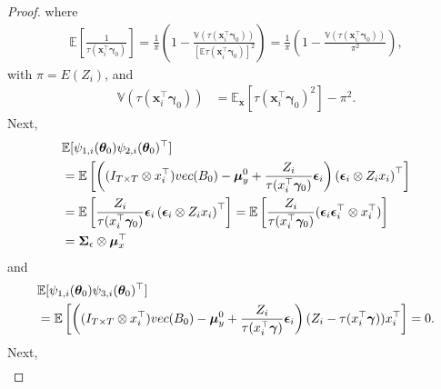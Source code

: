 \documentclass[10pt,a4paper]{amsart}
\newcommand{\IdenMat}{\textbf{I}}
\newcommand{\LogCoe}{\boldsymbol{\gamma}}
\newcommand{\ObsCov}{\textbf{x}_i}
\newcommand{\vect}{\emph{vec}}
\begin{document}
\begin{proof}
        where 
            \begin{align*}
                \mathbb{E}\left[ \frac{1}{\tau(\ObsCov^{\top}\LogCoe_0)} \right] = \frac{1}{\pi}\left( 1 - \frac{\mathbb{V}(\tau(\ObsCov^{\top}\LogCoe_0))}{ [\mathbb{E}\tau(\ObsCov^{\top}\LogCoe_0)]^2 } \right) = \frac{1}{\pi} \left(1 - \frac{\mathbb{V}(\tau(\ObsCov^{\top}\LogCoe_0))}{\pi^2} \right),
            \end{align*}
            with $\pi=E(Z_i)$,
            and
            \begin{align*}
                \mathbb{V}(\tau(\ObsCov^{\top}\LogCoe_0)) &= \mathbb{E}_{\textbf{x}}[ \tau(\ObsCov^{\top}\LogCoe_0)^2 ] - \pi^2.
            \end{align*}
        Next,        
            \begin{align*}
                &
                \mathbb{E} [ \psi_{1,i}(\boldsymbol{\theta}_0) \psi_{2,i}(\boldsymbol{\theta}_0)^{\top} ] \\
                &= \mathbb{E} \left[ \left( (\IdenMat_{T \times T} \otimes \ObsCov^{\top})\vect(\textbf{B}_0) - \boldsymbol{\mu}_y^0 + \frac{Z_i}{\tau(\ObsCov^{\top}\LogCoe_0)}\boldsymbol{\epsilon}_i \right) \left( \boldsymbol{\epsilon}_i \otimes Z_i \ObsCov \right)^{\top} \right] \\
                &= \mathbb{E} \left[ \frac{Z_i}{\tau(\ObsCov^{\top}\LogCoe_0)} \boldsymbol{\epsilon}_i  \left( \boldsymbol{\epsilon}_i \otimes Z_i \ObsCov \right)^{\top} \right] 
                = \mathbb{E} \left[ \frac{Z_i}{\tau(\ObsCov^{\top}\LogCoe_0)}  ( \boldsymbol{\epsilon}_i \boldsymbol{\epsilon}_i^{\top} \otimes \ObsCov^{\top} ) \right] \\
                &= \boldsymbol{\Sigma}_{\epsilon} \otimes\boldsymbol{\mu}_x^{\top}
            \end{align*}
        and 
            \begin{align*}
                &\mathbb{E} [ \psi_{1,i}(\boldsymbol{\theta}_0) \psi_{3,i}(\boldsymbol{\theta}_0)^{\top} ] \\
                &= \mathbb{E} \left[ \left( (\IdenMat_{T \times T} \otimes \ObsCov^{\top})\vect(\textbf{B}_0) - \boldsymbol{\mu}_y^0 + \frac{Z_i}{\tau(\ObsCov^{\top}\LogCoe)}\boldsymbol{\epsilon}_i \right) (Z_i - \tau(\ObsCov^{\top}\LogCoe)) \ObsCov^{\top} \right]
                = \textbf{0}. \\
            \end{align*}
        Next,
            \begin{align*}
                &

\end{align*}
\end{proof}
\end{document}

